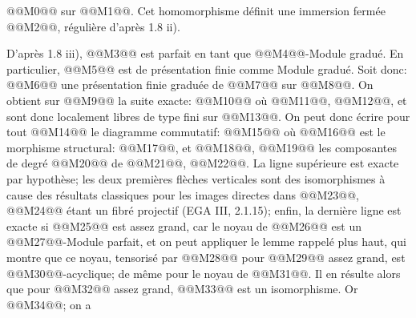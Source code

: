 
@@M0@@ sur @@M1@@. Cet
homomorphisme définit une immersion fermée @@M2@@, régulière d'après 1.8 ii).

D'après 1.8 iii), @@M3@@ est parfait en tant que @@M4@@-Module gradué. En particulier, @@M5@@ est de présentation finie comme Module gradué. Soit donc:
@@M6@@
une présentation finie graduée de @@M7@@ sur @@M8@@. On obtient sur @@M9@@ la suite exacte:
@@M10@@
où @@M11@@, @@M12@@, et sont donc localement libres de type fini sur @@M13@@. On peut donc écrire pour tout @@M14@@ le diagramme commutatif:
@@M15@@
où @@M16@@ est le morphisme structural: @@M17@@, et @@M18@@, @@M19@@ les composantes de degré @@M20@@ de @@M21@@, @@M22@@. La ligne supérieure est exacte par hypothèse; les deux premières flèches verticales sont des isomorphismes à cause des résultats classiques pour les images directes dans @@M23@@, @@M24@@ étant un fibré projectif (EGA III, 2.1.15); enfin, la dernière ligne est exacte si @@M25@@ est assez grand, car le noyau de @@M26@@ est un @@M27@@-Module parfait, et on peut appliquer le lemme rappelé plus haut, qui montre que ce noyau, tensorisé par @@M28@@ pour @@M29@@ assez grand, est @@M30@@-acyclique; de même pour le noyau de @@M31@@. Il en résulte alors que pour @@M32@@ assez grand, @@M33@@ est un isomorphisme. Or @@M34@@; on a
